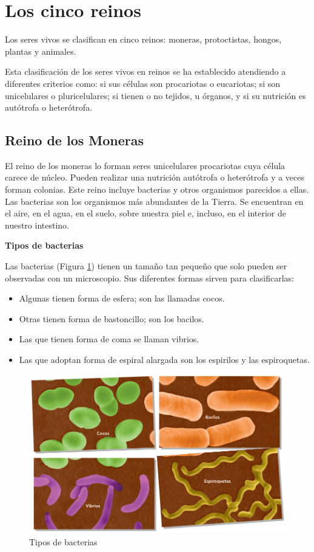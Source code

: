 \section{Los cinco reinos}

Los seres vivos se clasifican en cinco reinos: moneras, protoctistas, hongos, plantas y animales.

\vspace{3mm}
Esta clasificación de los seres vivos en reinos se ha establecido atendiendo a diferentes criterios como: si sus células son procariotas o eucariotas; si son unicelulares o pluricelulares; si tienen o no tejidos, u órganos, y si su nutrición es autótrofa o heterótrofa.

\subsection{Reino de los Moneras}

El reino de los moneras lo forman seres unicelulares procariotas cuya célula carece de núcleo. Pueden realizar una nutrición autótrofa o heterótrofa y a veces forman colonias. Este reino incluye bacterias y otros organismos parecidos a ellas. Las bacterias son los organismos más abundantes de la Tierra. Se encuentran en el aire, en el agua, en el suelo, sobre nuestra piel e, incluso, en el interior de nuestro intestino.

\vspace{3mm}
\textbf{Tipos de bacterias}

Las bacterias (Figura \ref{fig:tipos-bacterias}) tienen un tamaño tan pequeño que solo pueden ser observadas con un microscopio. Sus diferentes formas sirven para clasificarlas:

\begin{itemize}
    \item Algunas tienen forma de esfera; son las llamadas cocos.
    \item Otras tienen forma de bastoncillo; son los bacilos.
    \item Las que tienen forma de coma se llaman vibrios.
    \item Las que adoptan forma de espiral alargada son los espirilos y las espiroquetas.
\end{itemize}

\begin{figure}[!ht]
    \centering
    \includegraphics[width=0.7\linewidth]{Tema1/09_Tipos_bacterias.png}
    \caption{Tipos de bacterias}
    \label{fig:tipos-bacterias}
\end{figure}

